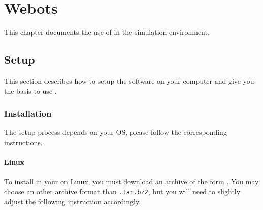 \newenvironment{attribute}[4]
{
    \begin{description}
    \item[Permissions] #2.
    \item[Type] #3.
      \ifx#4\empty\else
    \item[Range] #4.
      \fi
    \item[Description]
}{
    \end{description}
}

\chapter{Webots}
\label{sec:webots}

This chapter documents the use of \urbi in the \webots simulation
environment.

\section{Setup}

This section describes how to setup the software on your computer and
give you the basis to use \uwebots{}.

\subsection{Installation}

The setup process depends on your OS, please follow the corresponding
instructions.

\subsubsection{Linux}

To install \uwebots{} in your \webots{} on Linux, you must download an
archive of the form
.
You may choose an other archive format than \texttt{.tar.bz2}, but you
will need to slightly adjust the following instruction accordingly.


